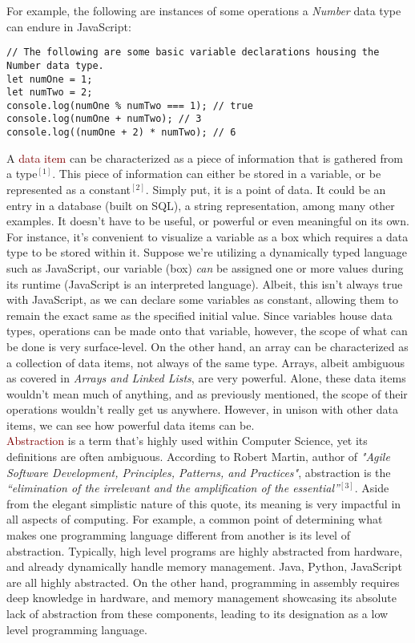 For example, the following are instances of some operations a \textit{Number} data type can endure in JavaScript:

\begin{verbatim}
// The following are some basic variable declarations housing the Number data type.
let numOne = 1;
let numTwo = 2;
console.log(numOne % numTwo === 1); // true
console.log(numOne + numTwo); // 3
console.log((numOne + 2) * numTwo); // 6
\end{verbatim}

A \textcolor{Maroon}{data item} can be characterized as a piece of information that is gathered from a type$^{[1]}$. This piece of information can either be stored in a variable, or be represented as a constant$^{[2]}$. Simply put, it is a point of data. It could be an entry in a database (built on SQL), a string representation, among many other examples. It doesn't have to be useful, or powerful or even meaningful on its own. For instance, it's convenient to visualize a variable as a box which requires a data type to be stored within it. Suppose we're utilizing a dynamically typed language such as JavaScript, our variable (box) \textit{can} be assigned one or more values during its runtime (JavaScript is an interpreted language). Albeit, this isn't always true with JavaScript, as we can declare some variables as constant, allowing them to remain the exact same as the specified initial value. Since variables house data types, operations can be made onto that variable, however, the scope of what can be done is very surface-level. On the other hand, an array can be characterized as a collection of data items, not always of the same type. Arrays, albeit ambiguous as covered in \textit{Arrays and Linked Lists}, are very powerful. Alone, these data items wouldn't mean much of anything, and as previously mentioned, the scope of their operations wouldn't really get us anywhere. However, in unison with other data items, we can see how powerful data items can be.
\\

\textcolor{Maroon}{Abstraction} is a term that's highly used within Computer Science, yet its definitions are often ambiguous. According to Robert Martin, author of \textit{"Agile Software Development, Principles, Patterns, and Practices"}, abstraction is the \textit{“elimination of the irrelevant and the amplification of the essential”}$^{[3]}$. Aside from the elegant simplistic nature of this quote, its meaning is very impactful in all aspects of computing. For example, a common point of determining what makes one programming language different from another is its level of abstraction. Typically, high level programs are highly abstracted from hardware, and already dynamically handle memory management. Java, Python, JavaScript are all highly abstracted. On the other hand, programming in assembly requires deep knowledge in hardware, and memory management showcasing its absolute lack of abstraction from these components, leading to its designation as a low level programming language. 
\\

